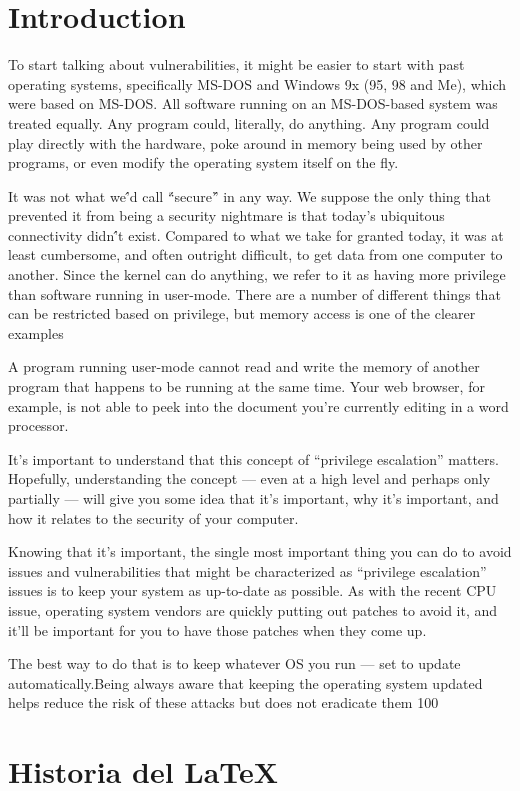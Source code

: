 \documentclass[letterpaper, 10pt, journal]{IEEEtran}
\begin{document}
\section{Introduction}
To start talking about vulnerabilities, it might be easier to start with past operating systems, specifically MS-DOS and Windows 9x (95, 98 and Me), which were based on MS-DOS.
All software running on an MS-DOS-based system was treated equally. Any program could, literally, do anything. Any program could play directly with the hardware, poke around in memory being used by other programs, or even modify the operating system itself on the fly.

It was not what we\'’d call \'“secure\'” in any way. We suppose the only thing that prevented it from being a security nightmare is that today’s ubiquitous connectivity didn\'’t exist. Compared to what we take for granted today, it was at least cumbersome, and often outright difficult, to get data from one computer to another. Since the kernel can do anything, we refer to it as having more privilege than software running in user-mode. There are a number of different things that can be restricted based on privilege, but memory access is one of the clearer examples

A program running user-mode cannot read and write the memory of another program that happens to be running at the same time. Your web browser, for example, is not able to peek into the document you’re currently editing in a word processor.

It’s important to understand that this concept of “privilege escalation” matters. Hopefully, understanding the concept — even at a high level and perhaps only partially — will give you some idea that it’s important, why it’s important, and how it relates to the security of your computer.

Knowing that it’s important, the single most important thing you can do to avoid issues and vulnerabilities that might be characterized as “privilege escalation” issues is to keep your system as up-to-date as possible. As with the recent CPU issue, operating system vendors are quickly putting out patches to avoid it, and it’ll be important for you to have those patches when they come up.

The best way to do that is to keep whatever OS you run — set to update automatically.Being always aware that keeping the operating system updated helps reduce the risk of these attacks but does not eradicate them 100%

\section{Historia del \LaTeX}
\end{document}
